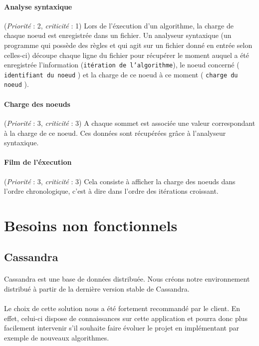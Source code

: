\documentclass[12pt]{article}
\newcommand{\besoin}[2] {
  (\textit{Priorité} : #1, \textit{criticité} : #2)
}
\begin{document}
\paragraph{Analyse syntaxique} \besoin{2}{1} Lors de l'éxecution d'un algorithme, la charge de chaque noeud est enregistrée dans un fichier.
Un analyseur syntaxique (un programme qui possède des règles et qui agit sur un fichier donné en entrée selon celles-ci) découpe chaque ligne du fichier pour récupérer le moment auquel a été enregistrée l'information (\texttt{itération de l'algorithme}),
le noeud concerné ( \texttt{ identifiant du noeud} ) et la charge de ce noeud à ce moment ( \texttt{charge du noeud} ).

\paragraph{Charge des noeuds}  \besoin{3}{3} A chaque sommet est associée une valeur correspondant à la charge de ce noeud.
Ces données sont récupérées grâce à l'analyseur syntaxique.

\paragraph{Film de l'éxecution} \besoin{3}{3} Cela consiste à afficher la charge des noeuds dans l'ordre chronologique, c'est à dire dans l'ordre des itérations croissant.


\newpage

\section{Besoins non fonctionnels}

\subsection{Cassandra}

\paragraph{} Cassandra est une base de données distribuée.
Nous créons notre environnement distribué à partir de la dernière version stable de Cassandra.

\paragraph{} Le choix de cette solution nous a été fortement recommandé par le client.
En effet, celui-ci dispose de connaissances sur cette application et pourra donc plus facilement intervenir s'il souhaite faire évoluer le projet en implémentant par exemple de nouveaux algorithmes.
\end{document}
